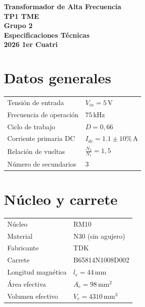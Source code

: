 \documentclass[a4paper,11pt]{article}
\begin{document}
\begin{center}
    {\Large \textbf{Transformador de Alta Frecuencia\\ TP1 TME\\ Grupo 2}}\\
    \vspace{2mm}
    \textbf{Especificaciones Técnicas\\2026 1er Cuatri}
\end{center}

\vspace{5mm}

\section*{Datos generales}

\begin{tabular}{ll}
\toprule
Tensión de entrada & $V_{in} = 5\,\text{V}$ \\
Frecuencia de operación & $75\,\text{kHz}$ \\
Ciclo de trabajo & $D = 0{,}66$ \\
Corriente primaria DC & $I_{dc} = 1.1 \pm 10\%\,\text{A}$ \\
Relación de vueltas & $\frac{N_2}{N_1} = 1{,}5$ \\
Número de secundarios & 3 \\
\bottomrule
\end{tabular}

\vspace{5mm}

\section*{Núcleo y carrete}

\begin{tabular}{ll}
\toprule
Núcleo & RM10 \\
Material & N30 (sin agujero) \\
Fabricante & TDK \\
Carrete & B65814N1008D002 \\
Longitud magnética & $l_e = 44\,\text{mm}$ \\
Área efectiva & $A_e = 98\,\text{mm}^2$ \\
Volumen efectivo & $V_e = 4310\,\text{mm}^3$ \\
\bottomrule
\end{tabular}

\vspace{5mm}
\end{document}
